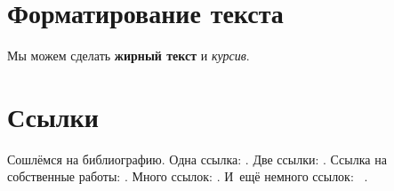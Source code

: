 \section{Форматирование текста}\label{sec:ch1/sec1}

Мы можем сделать \textbf{жирный текст} и \textit{курсив}.

\section{Ссылки}\label{sec:ch1/sec2}

Сошлёмся на библиографию.
Одна ссылка: \cite[с.~54]{Sokolov}\cite[с.~36]{Gaidaenko}.
Две ссылки: \cite{Sokolov,Gaidaenko}.
Ссылка на собственные работы: \cite{vakbib1, confbib2}.
Много ссылок: %
\cite{Lermontov, Management, Borozda, Marketing, Constitution, FamilyCode,
    Gost.7.0.53, Razumovski, Lagkueva, Pokrovski, Methodology, Berestova,
    Kriger}%
%
.
И~ещё немного ссылок:~\cite{Article,Book,Booklet,Conference,Inbook,Incollection,Manual,Mastersthesis,
    Misc,Phdthesis,Proceedings,Techreport,Unpublished}
\cite{medvedev2006jelektronnye, CEAT:CEAT581, doi:10.1080/01932691.2010.513279,
    Gosele1999161,Li2007StressAnalysis, Shoji199895, test:eisner-sample,
    test:eisner-sample-shorted, AB_patent_Pomerantz_1968, iofis_patent1960}%
%
.

%

